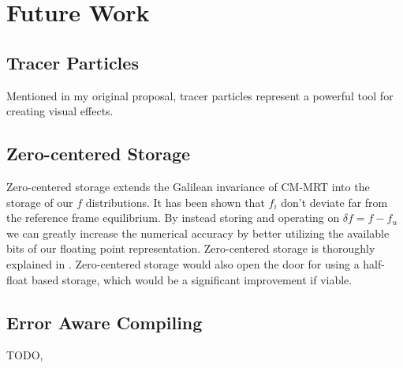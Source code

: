 \section{Future Work}\label{sec:futurework}
\subsection{Tracer Particles}
Mentioned in my original proposal, tracer particles
represent a powerful tool for creating visual effects.


\subsection{Zero-centered Storage}
Zero-centered storage extends the Galilean invariance of CM-MRT 
into the storage of our $f$ distributions.
It has been shown that $f_i$ don't deviate far from the reference
frame equilibrium.
By instead storing and operating on $\delta f = f - f_u$ 
we can greatly increase the numerical accuracy by better
utilizing the available bits of our floating point representation.
Zero-centered storage is thoroughly explained in \cite{Hennig2023}.
Zero-centered storage would also open the door for using a half-float 
based storage, which would be a significant improvement if viable.

\subsection{Error Aware Compiling}
TODO, 


